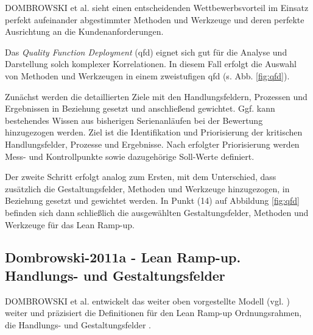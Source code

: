 DOMBROWSKI et al. sieht einen entscheidenden Wettbewerbsvorteil im Einsatz perfekt aufeinander abgestimmter Methoden und Werkzeuge und deren perfekte Ausrichtung an die Kundenanforderungen. 

Das \textit{Quality Function Deployment} (\gls{qfd}) eignet sich gut für die Analyse und Darstellung solch komplexer Korrelationen. In diesem Fall erfolgt die Auswahl von Methoden und Werkzeugen in einem zweistufigen \gls{qfd} (s. Abb. \ref{fig:qfd}). 

Zunächst werden die detaillierten Ziele mit den Handlungsfeldern, Prozessen und Ergebnissen in Beziehung gesetzt und anschließend gewichtet. Ggf. kann bestehendes Wissen aus bisherigen Serienanläufen bei der Bewertung hinzugezogen werden. 
Ziel ist die Identifikation und Priorisierung der kritischen Handlungsfelder, Prozesse und Ergebnisse.
Nach erfolgter Priorisierung werden Mess- und Kontrollpunkte sowie dazugehörige Soll-Werte definiert. 

Der zweite Schritt erfolgt analog zum Ersten, mit dem Unterschied, dass zusätzlich die Gestaltungsfelder, Methoden und Werkzeuge hinzugezogen, in Beziehung gesetzt und gewichtet werden. 
In Punkt (14) auf Abbildung \ref{fig:qfd} befinden sich dann schließlich die ausgewählten Gestaltungsfelder, Methoden und Werkzeuge für das Lean Ramp-up. 


\subsection*{Dombrowski-2011a - Lean Ramp-up. Handlungs- und Gestaltungsfelder}\label{sec:dom11a}

DOMBROWSKI et al. entwickelt das weiter oben vorgestellte Modell (vgl. \cite{Dombrowski2009}) %
weiter und präzisiert die Definitionen für den Lean Ramp-up Ordnungsrahmen, die Handlungs- und Gestaltungsfelder \autocite{Dombrowski2011a}. 

